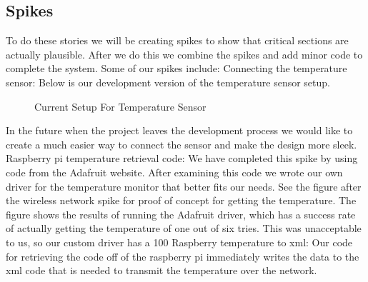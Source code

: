 \documentclass{report}
\begin{document}
\subsection*{Spikes}
To do these stories we will be creating spikes to show that critical sections are actually plausible. 
After we do this we combine the spikes and add minor code to complete the system.
Some of our spikes include:
\newline
Connecting the temperature sensor:
\newline
\indent
Below is our development version of the temperature sensor setup.
\begin{figure}[H]
\caption{Current Setup For Temperature Sensor}
\end{figure}
In the future when the project leaves the development process we would like to create a much easier way to connect the sensor and make the design more sleek.
\newline
Raspberry pi temperature retrieval code:
\newline
\indent
We have completed this spike by using code from the Adafruit website.
After examining this code we wrote our own driver for the temperature monitor that better fits our needs.
See the figure after the wireless network spike for proof of concept for getting the temperature. The figure shows the results of running the Adafruit driver, which has a success rate of actually getting the temperature of one out of six tries.  This was unacceptable to us, so our custom driver has a 100%
\newline
Raspberry temperature to xml:
\newline
\indent
Our code for retrieving the code off of the raspberry pi immediately writes the data to the xml code that is needed to transmit the temperature over the network. 
\end{document}
